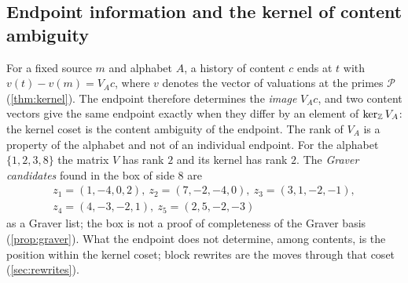 \subsection{Endpoint information and the kernel of content ambiguity}
For a fixed source $m$ and alphabet $A$, a history of content $c$ ends at $t$ with $v(t)-v(m)=V_Ac$, where $v$ denotes the vector of valuations at the primes $\mathcal P$ (\cref{thm:kernel}). The endpoint therefore determines the \emph{image} $V_Ac$, and two content vectors give the same endpoint exactly when they differ by an element of $\ker_{\mathbb Z}V_A$: the kernel coset is the content ambiguity of the endpoint. The rank of $V_A$ is a property of the alphabet and not of an individual endpoint. For the alphabet $\{1,2,3,8\}$ the matrix $V$ has rank $2$ and its kernel has rank $2$. The \emph{Graver candidates} found in the box of side $8$ are
\[\begin{gathered}z_1=(1,-4,0,2),\ z_2=(7,-2,-4,0),\ z_3=(3,1,-2,-1),\\ z_4=(4,-3,-2,1),\ z_5=(2,5,-2,-3)\end{gathered}\]
 as a Graver list; the box is not a proof of completeness of the Graver basis (\cref{prop:graver}). What the endpoint does not determine, among contents, is the position within the kernel coset; block rewrites are the moves through that coset (\cref{sec:rewrites}).
